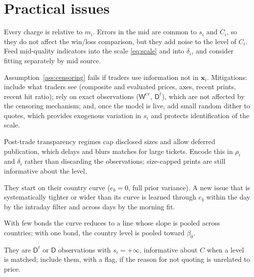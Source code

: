 \documentclass[11pt,a4paper]{article}
\theoremstyle{definition}
\theoremstyle{remark}
\newcommand{\bx}{\bm{x}}
\newcommand{\Wc}{\mathsf{W}^{\mathrm{cv}}}
\newcommand{\Dl}{\mathsf{D}^{\ell}}
\newcommand{\Dn}{\mathsf{D}}
\begin{document}
\section{Practical issues}\label{sec:practical}

\begin{description}[itemsep=3pt,leftmargin=0pt]
\item[Reference mid quality.] Every charge is relative to $m_i$. Errors in the mid are common to $s_i$ and $C_i$, so they do not affect the win/loss comparison, but they add noise to the level of $C_i$. Feed mid-quality indicators into the scale \eqref{eq:scale} and into $\delta_i$, and consider fitting separately by mid source.
\item[Endogeneity of our quotes.] Assumption~\ref{ass:censoring} fails if traders use information not in $\bx_i$. Mitigations: include what traders see (composite and evaluated prices, axes, recent prints, recent hit ratio); rely on exact observations ($\Wc$, $\Dl$), which are not affected by the censoring mechanism; and, once the model is live, add small random dither to quotes, which provides exogenous variation in $s_i$ and protects identification of the scale.
\item[Tape matching.] Post-trade transparency regimes cap disclosed sizes and allow deferred publication, which delays and blurs matches for large tickets. Encode this in $\rho_i$ and $\delta_i$ rather than discarding the observations; size-capped prints are still informative about the level.
\item[New and rarely quoted bonds.] They start on their country curve ($e_b=0$, full prior variance). A new issue that is systematically tighter or wider than its curve is learned through $e_b$ within the day by the intraday filter and across days by the morning fit.
\item[Sparse countries.] With few bonds the curve reduces to a line whose slope is pooled across countries; with one bond, the country level is pooled toward $\beta_0$.
\item[Inquiries we did not quote.] They are $\Dl$ or $\Dn$ observations with $s_i=+\infty$, informative about $C$ when a level is matched; include them, with a flag, if the reason for not quoting is unrelated to price.
\end{description}

\end{document}

